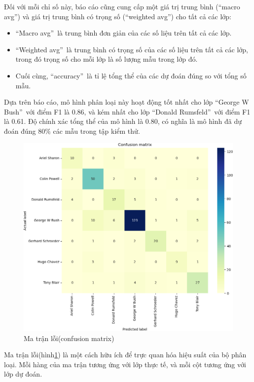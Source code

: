 \documentclass[12pt,a4paper,oneside]{report}
\numberwithin{equation}{section}
\begin{document}
Đối với mỗi chỉ số này, báo cáo cũng cung cấp một giá trị trung bình (\textquotedblleft macro avg\textquotedblright) và giá trị trung bình có trọng số (\textquotedblleft weighted avg\textquotedblright) cho tất cả các lớp:
\begin{itemize}
\item \textquotedblleft Macro avg\textquotedblright\ là trung bình đơn giản của các số liệu trên tất cả các lớp.
\item \textquotedblleft Weighted avg\textquotedblright\ là trung bình có trọng số của các số liệu trên tất cả các lớp, trong đó trọng số cho mỗi lớp là số lượng mẫu trong lớp đó.
\item Cuối cùng, \textquotedblleft accuracy\textquotedblright\ là tỉ lệ tổng thể của các dự đoán đúng so với tổng số mẫu.
\end{itemize}
Dựa trên báo cáo, mô hình phân loại này hoạt động tốt nhất cho lớp \textquotedblleft George W Bush\textquotedblright\ với điểm F1 là 0.86, và kém nhất cho lớp \textquotedblleft Donald Rumsfeld\textquotedblright\ với điểm F1 là 0.61. Độ chính xác tổng thể của mô hình là 0.80, có nghĩa là mô hình đã dự đoán đúng 80\% các mẫu trong tập kiểm thử.
\begin{figure}[htp]
	\centering
	\includegraphics[scale=0.8]{heatmap.png}
	\caption{Ma trận lỗi(confusion matrix)}
	\label{fig:headmap}
\end{figure}

Ma trận lỗi(hình\ref{fig:headmap}) là một cách hữu ích để trực quan hóa hiệu suất của bộ phân loại. Mỗi hàng của ma trận tương ứng với lớp thực tế, và mỗi cột tương ứng với lớp dự đoán.
\end{document}

